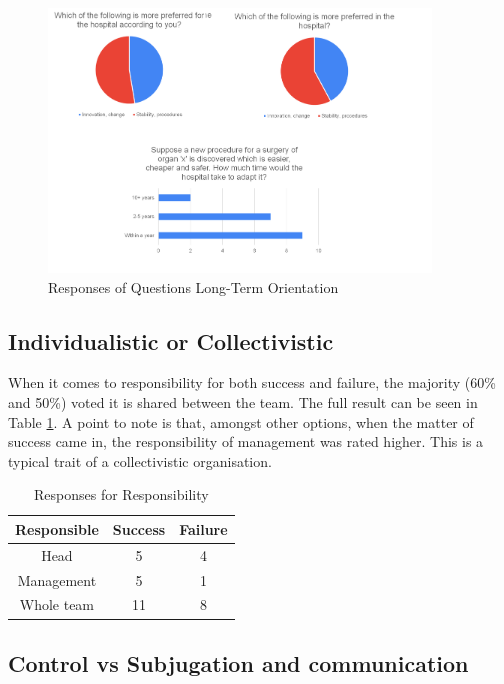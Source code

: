 \documentclass[12pt]{article}
\begin{document}
\begin{figure}
    \begin{center}
        \includegraphics[width = 4in]{Time.png}
    \end{center}
    \caption{Responses of Questions Long-Term Orientation}
    \label{Time}
\end{figure}

\subsection{Individualistic or Collectivistic}

When it comes to responsibility for both success and failure, the majority (60\% and 50\%) voted it is shared between the team. The full result can be seen in Table \ref{responsible}. A point to note is that, amongst other options, when the matter of success came in, the responsibility of management was rated higher. This is a typical trait of a collectivistic organisation.

\begin{table}
    \begin{center}
        \begin{tabular}{|c|c|c|}
            \hline
            Responsible & Success & Failure \\
            \hline
            Head & 5 & 4\\
            Management & 5 & 1\\
            Whole team & 11 & 8\\
            \hline
        \end{tabular}
        \caption{Responses for Responsibility}
        \label{responsible}
    \end{center}
\end{table}

\subsection{Control vs Subjugation and communication}
\end{document}
